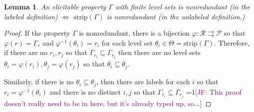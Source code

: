 \documentclass[12pt]{article}
\newcommand{\Comments}{1}
\newcommand{\mynote}[2]{\ifnum\Comments=1\textcolor{#1}{#2}\fi}
\newcommand{\jessie}[1]{\mynote{purple}{[JF: #1]}}
\renewcommand{\P}{\mathcal{P}}
\newcommand{\R}{\mathcal{R}}
\newcommand{\toto}{\rightrightarrows}
\newcommand{\strip}{\mathrm{strip}}
\newtheorem{lemma}{Lemma}
\begin{document}
\begin{lemma}\label{lem:nonredundant-defs-equivalent}
	An elicitable property $\Gamma$ with finite level sets is nonredundant (in the labeled definition) $\iff$ $\strip(\Gamma)$ is nonredundant (in the unlabeled definition.)
\end{lemma}
\begin{proof}
	If the property $\Gamma$ is nonredundant, there is a bijection $\varphi:\R \toto \P$ so that $\varphi(r) = \Gamma_r$ and $\varphi^{-1}(\theta_i) = r_i$ for each level set $\theta_i \in \Theta = \strip(\Gamma)$.
	Therefore, if there are no $r_i, r_j$ so that $\Gamma_{r_i} \subseteq \Gamma_{r_j}$ then there are no level sets $\theta_i = \varphi(r_i), \theta_j = \varphi(r_j)$ so that $\theta_i \subseteq \theta_j$.
	
	Similarly, if there is no $\theta_i \subseteq \theta_j$, then there are labels for each $i$ so that $r_i = \varphi^{-1}(\theta_i)$ and there is no distinct $i,j$ so that $\Gamma_{r_i} \subseteq \Gamma_{r_j}$ 	
	\jessie{This proof doesn't really need to be in here, but it's already typed up, so...}
	
%
%		
%		
%		
%
	
\end{proof}
\end{document}
